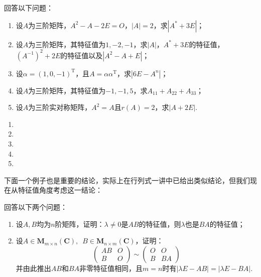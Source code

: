 \begin{example}
    回答以下问题：
    \begin{enumerate}
        \item 设$A$为三阶矩阵，$A^2-A-2E=O$，$|A|=2$，求$|A^*+3E|$；

        \item 设$A$为三阶矩阵，其特征值为$1,-2,-1$，求$|A|$，$A^*+3E$的特征值，$(A^{-1})^2+2E$的特征值以及$|A^2-A+E|$；

        \item 设$\alpha=(1,0,-1)^\mathrm{T}$，且$A=\alpha\alpha^\mathrm{T}$，求$|6E-A^n|$；

        \item 设$A$为三阶矩阵，其特征值为$-1,-1,5$，求$A_{11}+A_{22}+A_{33}$；

        \item 设$A$为三阶实对称矩阵，$A^2=A$且$r(A)=2$，求$|A+2E|$.
    \end{enumerate}
\end{example}

\begin{solution}
    \begin{enumerate}
        \item

        \item

        \item

        \item

        \item
    \end{enumerate}
\end{solution}

下面一个例子也是重要的结论，实际上在行列式一讲中已给出类似结论，但我们现在从特征值角度考虑这一结论：
\begin{example}
    回答以下两个问题：
    \begin{enumerate}
        \item \label{item:18:特征值相同:1}
              设$A,B$均为$n$阶矩阵，证明：$\lambda\neq 0$是$AB$的特征值，则$\lambda$也是$BA$的特征值；

        \item \label{item:18:特征值相同:2}
              设$A\in \mathbf{M}_{m\times n}(\mathbf{C}),\enspace B\in \mathbf{M}_{n\times m}(\mathbf{C})$，证明：
              \[ \begin{pmatrix}
                      AB & O \\ B & O
                  \end{pmatrix}\sim\begin{pmatrix}
                      O & O \\ B & BA
                  \end{pmatrix} \]
              并由此推出$AB$和$BA$非零特征值相同，且$m=n$时有$|\lambda E-AB|=|\lambda E-BA|$.
    \end{enumerate}
\end{example}

